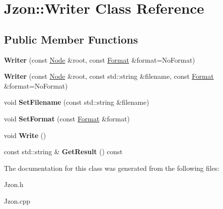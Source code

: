 \hypertarget{class_jzon_1_1_writer}{\section{Jzon\-:\-:Writer Class Reference}
\label{class_jzon_1_1_writer}
}
\subsection*{Public Member Functions}
\begin{DoxyCompactItemize}
\item 
\hypertarget{class_jzon_1_1_writer_a149d7419887f854a3b480194632f5bd3}{{\bfseries Writer} (const \hyperlink{class_jzon_1_1_node}{Node} \&root, const \hyperlink{struct_jzon_1_1_format}{Format} \&format=No\-Format)}\label{class_jzon_1_1_writer_a149d7419887f854a3b480194632f5bd3}

\item 
\hypertarget{class_jzon_1_1_writer_a2551d27b952fbd2f8bf9c1e9003c27e6}{{\bfseries Writer} (const \hyperlink{class_jzon_1_1_node}{Node} \&root, const std\-::string \&filename, const \hyperlink{struct_jzon_1_1_format}{Format} \&format=No\-Format)}\label{class_jzon_1_1_writer_a2551d27b952fbd2f8bf9c1e9003c27e6}

\item 
\hypertarget{class_jzon_1_1_writer_a260fcff96207b12dd1a99b2482879247}{void {\bfseries Set\-Filename} (const std\-::string \&filename)}\label{class_jzon_1_1_writer_a260fcff96207b12dd1a99b2482879247}

\item 
\hypertarget{class_jzon_1_1_writer_a07f8479fa59920d8e3223e17d087918b}{void {\bfseries Set\-Format} (const \hyperlink{struct_jzon_1_1_format}{Format} \&format)}\label{class_jzon_1_1_writer_a07f8479fa59920d8e3223e17d087918b}

\item 
\hypertarget{class_jzon_1_1_writer_a592006df4de2c148f6dc629c8e01ea77}{void {\bfseries Write} ()}\label{class_jzon_1_1_writer_a592006df4de2c148f6dc629c8e01ea77}

\item 
\hypertarget{class_jzon_1_1_writer_a6200aa0421736ab18a8d1ecdb4dae597}{const std\-::string \& {\bfseries Get\-Result} () const }\label{class_jzon_1_1_writer_a6200aa0421736ab18a8d1ecdb4dae597}

\end{DoxyCompactItemize}


The documentation for this class was generated from the following files\-:\begin{DoxyCompactItemize}
\item 
Jzon.\-h\item 
Jzon.\-cpp\end{DoxyCompactItemize}
